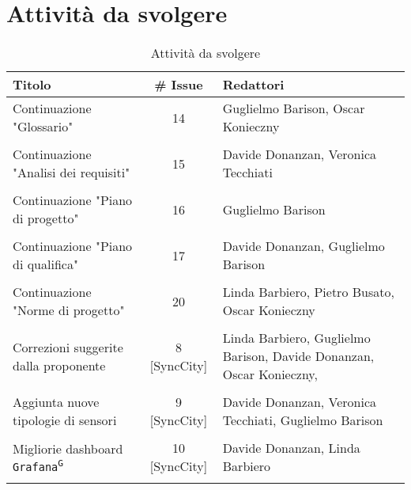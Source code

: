 \documentclass[8pt]{article}
\newcommand{\glossterm}[1]{#1\textsuperscript{G}} %
\begin{document}
\section{Attività da svolgere}
\begin{table}[ht!]
	\centering
	\begin{tabular}{p{7cm}cp{7cm}}
		\toprule
		\textbf{Titolo} & \textbf{\# Issue} & \textbf{Redattori} \\
		\midrule
		Continuazione "Glossario" & 14 & Guglielmo Barison, Oscar Konieczny\\\\
		Continuazione "Analisi dei requisiti" & 15 & Davide Donanzan, Veronica Tecchiati\\\\
		Continuazione "Piano di progetto"  & 16 & Guglielmo Barison\\\\
		Continuazione "Piano di qualifica" & 17 & Davide Donanzan, Guglielmo Barison\\\\
		Continuazione "Norme di progetto" & 20 & Linda Barbiero, Pietro Busato, Oscar Konieczny\\\\
            Correzioni suggerite dalla proponente & 8 [SyncCity] & Linda Barbiero, Guglielmo Barison, Davide Donanzan, Oscar Konieczny, \\\\
            Aggiunta nuove tipologie di sensori & 9 [SyncCity] & Davide Donanzan, Veronica Tecchiati, Guglielmo Barison\\\\
		Migliorie dashboard \texttt{\glossterm{Grafana}} & 10 [SyncCity] & Davide Donanzan, Linda Barbiero\\\\
		\bottomrule
	\end{tabular}
	\caption{Attività da svolgere}
	\label{table:Attivita da svolgere}
\end{table}
\end{document}
